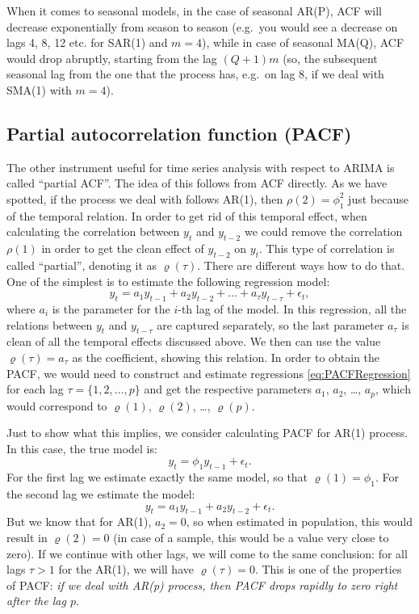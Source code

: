 \documentclass[]{book}
\theoremstyle{definition}
\theoremstyle{definition}
\theoremstyle{definition}
\theoremstyle{definition}
\theoremstyle{remark}
\begin{document}
When it comes to seasonal models, in the case of seasonal AR(P), ACF will decrease exponentially from season to season (e.g.~you would see a decrease on lags 4, 8, 12 etc. for SAR(1) and \(m=4\)), while in case of seasonal MA(Q), ACF would drop abruptly, starting from the lag \((Q+1)m\) (so, the subsequent seasonal lag from the one that the process has, e.g.~on lag 8, if we deal with SMA(1) with \(m=4\)).

\hypertarget{PACF}{%
\subsection{Partial autocorrelation function (PACF)}\label{PACF}}

The other instrument useful for time series analysis with respect to ARIMA is called ``partial ACF''. The idea of this follows from ACF directly. As we have spotted, if the process we deal with follows AR(1), then \(\rho(2)=\phi_1^2\) just because of the temporal relation. In order to get rid of this temporal effect, when calculating the correlation between \(y_t\) and \(y_{t-2}\) we could remove the correlation \(\rho(1)\) in order to get the clean effect of \(y_{t-2}\) on \(y_t\). This type of correlation is called ``partial'', denoting it as \(\varrho(\tau)\). There are different ways how to do that. One of the simplest is to estimate the following regression model:
\begin{equation}
  y_t = a_1 y_{t-1} + a_2 y_{t-2} + \dots + a_\tau y_{t-\tau} + \epsilon_t,
  \label{eq:PACFRegression}
\end{equation}
where \(a_i\) is the parameter for the \(i\)-th lag of the model. In this regression, all the relations between \(y_t\) and \(y_{t-\tau}\) are captured separately, so the last parameter \(a_\tau\) is clean of all the temporal effects discussed above. We then can use the value \(\varrho(\tau) = a_\tau\) as the coefficient, showing this relation. In order to obtain the PACF, we would need to construct and estimate regressions \eqref{eq:PACFRegression} for each lag \(\tau=\{1, 2, \dots, p\}\) and get the respective parameters \(a_1\), \(a_2\), \ldots{}, \(a_p\), which would correspond to \(\varrho(1)\), \(\varrho(2)\), \ldots{}, \(\varrho(p)\).

Just to show what this implies, we consider calculating PACF for AR(1) process. In this case, the true model is:
\begin{equation*}
  y_t = \phi_1 y_{t-1} + \epsilon_t.
\end{equation*}
For the first lag we estimate exactly the same model, so that \(\varrho(1)=\phi_1\). For the second lag we estimate the model:
\begin{equation*}
  y_t = a_1 y_{t-1} + a_2 y_{t-2} + \epsilon_t.
\end{equation*}
But we know that for AR(1), \(a_2=0\), so when estimated in population, this would result in \(\varrho(2)=0\) (in case of a sample, this would be a value very close to zero). If we continue with other lags, we will come to the same conclusion: for all lags \(\tau>1\) for the AR(1), we will have \(\varrho(\tau)=0\). This is one of the properties of PACF: \emph{if we deal with AR(p) process, then PACF drops rapidly to zero right after the lag \(p\)}.
\end{document}
